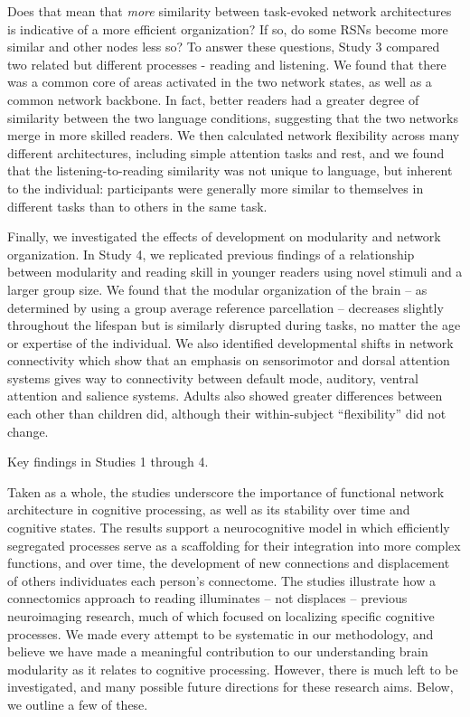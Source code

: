 Does that mean that \textit{more} similarity between task-evoked network architectures is indicative of a more efficient organization? If so, do some RSNs become more similar and other nodes less so?  To answer these questions, Study 3 compared two related but different processes - reading and listening. We found that there was a common core of areas activated in the two network states, as well as a common network backbone. In fact, better readers had a greater degree of similarity between the two language conditions, suggesting that the two networks merge in more skilled readers. We then calculated network flexibility across many different architectures, including simple attention tasks and rest, and we found that the listening-to-reading similarity was not unique to language, but inherent to the individual: participants were generally more similar to themselves in different tasks than to others in the same task.

Finally, we investigated the effects of development on modularity and network organization. In Study 4, we replicated previous findings of a relationship between modularity and reading skill in younger readers using novel stimuli and a larger group size. We found that the modular organization of the brain -- as determined by using a group average reference parcellation -- decreases slightly throughout the lifespan but is similarly disrupted during tasks, no matter the age or expertise of the individual. We also identified developmental shifts in network connectivity which show that an emphasis on sensorimotor and dorsal attention systems gives way to connectivity between default mode, auditory, ventral attention and salience systems. Adults also showed greater differences between each other than children did, although their within-subject ``flexibility'' did not change.

\begin{table}[t!]
	\renewcommand{\tabcolsep}{0.2cm}
	\centering
	
	\caption[Key findings in Studies 1 through 4]{Key findings in Studies 1 through 4.}
	\label{table:ch6-key-findings}
\end{table}

Taken as a whole, the studies underscore the importance of functional network architecture in cognitive processing, as well as its stability over time and cognitive states. The results support a neurocognitive model in which efficiently segregated processes serve as a scaffolding for their integration into more complex functions, and over time, the development of new connections and displacement of others individuates each person's connectome. The studies illustrate how a connectomics approach to reading illuminates -- not displaces -- previous neuroimaging research, much of which focused on localizing specific cognitive processes. We made every attempt to be systematic in our methodology, and believe we have made a meaningful contribution to our understanding brain modularity as it relates to cognitive processing. However, there is much left to be investigated, and many possible future directions for these research aims. Below, we outline a few of these.

